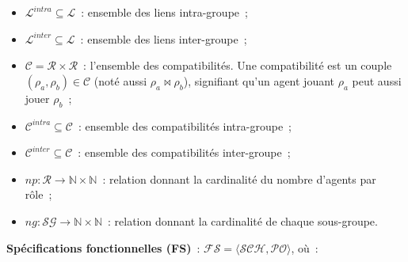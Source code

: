 \begin{itemize}
\begin{itemize}
\begin{itemize}
                \end{itemize}
          \item $\mathcal{L}^{intra} \subseteq \mathcal{L}$~: ensemble des liens intra-groupe~;
          \item $\mathcal{L}^{inter} \subseteq \mathcal{L}$~: ensemble des liens inter-groupe~;
          \item $\mathcal{C} = \mathcal{R} \times \mathcal{R}$~: l'ensemble des compatibilités. Une compatibilité est un couple $(\rho_a, \rho_b) \in \mathcal{C}$ (noté aussi $\rho_a \bowtie \rho_b$), signifiant qu'un agent jouant $\rho_a$ peut aussi jouer $\rho_b$~;
          \item $\mathcal{C}^{intra} \subseteq \mathcal{C}$~: ensemble des compatibilités intra-groupe~;
          \item $\mathcal{C}^{inter} \subseteq \mathcal{C}$~: ensemble des compatibilités inter-groupe~;
          \item $np: \mathcal{R} \rightarrow \mathbb{N} \times \mathbb{N}$~: relation donnant la cardinalité du nombre d'agents par rôle~;
          \item $ng: \mathcal{SG} \rightarrow \mathbb{N} \times \mathbb{N}$~: relation donnant la cardinalité de chaque sous-groupe.
        \end{itemize}
\end{itemize}

\medskip

\noindent \textbf{Spécifications fonctionnelles (FS)}~: \quad $\mathcal{FS} = \langle \mathcal{SCH}, \mathcal{PO} \rangle$, où~:

